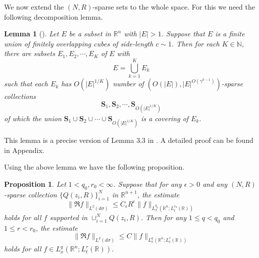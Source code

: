 \documentclass[11pt,reqno]{amsart}
\theoremstyle{plain}
\newtheorem{lem}[thm]{Lemma}
\newtheorem{prop}[thm]{Proposition}
\theoremstyle{definition}
\theoremstyle{remark}
\numberwithin{equation}{section}
\begin{document}
We now extend the $(N,R)$-sparse sets to the whole space. For this we need the following decomposition lemma.
\begin{lem}[\cite{T1}]\label{lem:DecE}
Let $E$ be a subset in $\mathbb R^n$ with $|E| >1$. Suppose that $E$ is a finite union of finitely overlapping cubes of side-length $c \sim 1$.
Then for each $K \in \mathbb{N}$, there are subsets $E_1, E_2, \cdots, E_K$ of $E$ with
\[
    E = \bigcup_{k=1}^{K} E_k
\]
such that each $E_k$ has $O(|E|^{1/K})$ number of  $(O(|E|), |E|^{O(\gamma^{k-1})})$-sparse collections 
\[
\mathbf S_1, \mathbf S_2, \cdots, \mathbf S_{O(|E|^{1/K})}
\] of which the union $\mathbf S_1 \cup \mathbf S_2 \cup  \cdots \cup \mathbf S_{O(|E|^{1/K})}$ is a covering of $E_k$.
\end{lem}
This lemma is a precise version of Lemma 3.3 in \cite{T1}. A detailed proof can be found in Appendix.

Using the above lemma we have the following proposition.
\begin{prop}\label{prop:glob_d}
Let $1 < q_0,r_0 < \infty$.
Suppose that for any $\epsilon>0$ and any $(N,R)$-sparse collection $\{Q(z_i,R)\}_{i=1}^{N}$ in $\mathbb R^{n+1}$,
the estimate
    \begin{equation} \label{eqn:sparse_rest}
    \| \mathfrak R f \|_ {L^{2}(d\sigma)}\leq C_{\epsilon} R^{\epsilon} \|f\|_{L_x^{q_0}(\mathbb R^n; L_t^{r_0}(\mathbb R) )}
    \end{equation}
holds for all $f$ supported in $\cup_{i=1}^{N} Q(z_i,R)$.
Then for any $1\leq q < q_0$ and $1\leq r < r_0$, the estimate
    \begin{equation*} %
    \| \mathfrak R f \|_ {L^{2}(d\sigma)}\le C\|f\|_{L_x^{q}(\mathbb R^n; L_t^{r}(\mathbb R) )}
    \end{equation*}
holds for all $f \in L_x^{q}(\mathbb R^n; L_t^{r}(\mathbb R) )$.
\end{prop}
\end{document}
